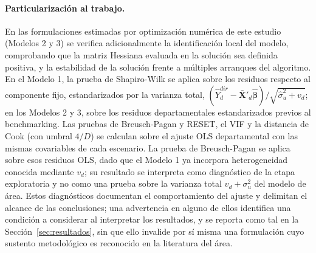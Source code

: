 \paragraph{Particularización al trabajo.}
En las formulaciones estimadas por optimización numérica de este estudio (Modelos 2 y 3) se verifica adicionalmente la identificación local del modelo, comprobando que la matriz Hessiana evaluada en la solución sea definida positiva, y la estabilidad de la solución frente a múltiples arranques del algoritmo. En el Modelo 1, la prueba de Shapiro-Wilk se aplica sobre los residuos respecto al componente fijo, estandarizados por la varianza total, $(\hat{Y}_d^{dir}-\bar{\mathbf{X}}'_d\hat{\boldsymbol{\beta}})/\sqrt{\hat{\sigma}^2_u+v_d}$; en los Modelos 2 y 3, sobre los residuos departamentales estandarizados previos al benchmarking. Las pruebas de Breusch-Pagan y RESET, el VIF y la distancia de Cook (con umbral $4/D$) se calculan sobre el ajuste OLS departamental con las mismas covariables de cada escenario. La prueba de Breusch-Pagan se aplica sobre esos residuos OLS, dado que el Modelo 1 ya incorpora heterogeneidad conocida mediante $v_d$; su resultado se interpreta como diagnóstico de la etapa exploratoria y no como una prueba sobre la varianza total $v_d+\sigma_u^2$ del modelo de área. Estos diagnósticos documentan el comportamiento del ajuste y delimitan el alcance de las conclusiones; una advertencia en alguno de ellos identifica una condición a considerar al interpretar los resultados, y se reporta como tal en la Sección~\ref{sec:resultados}, sin que ello invalide por sí misma una formulación cuyo sustento metodológico es reconocido en la literatura del área.